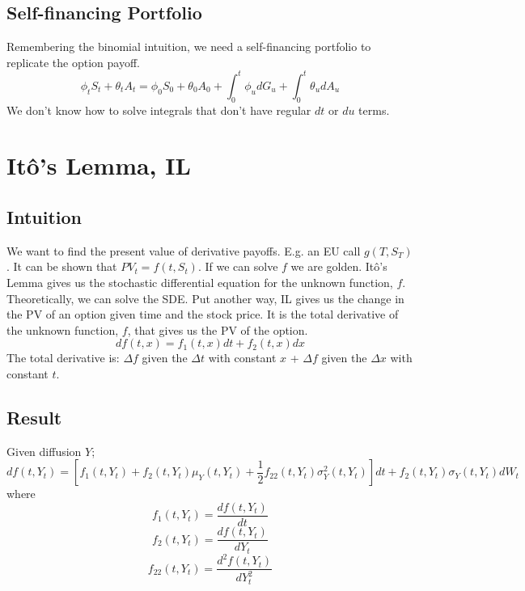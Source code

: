 \documentclass[12pt]{article}
\begin{document}
\subsection{Self-financing Portfolio}

Remembering the binomial intuition, we need a self-financing portfolio to
replicate the option payoff.
\begin{equation} \label{replport}
\phi_tS_t+\theta_tA_t=\phi_0S_0+\theta_0A_0+ \int_0^t \phi_u dG_u +
\int_0^t \theta_udA_u
\end{equation}
We don't know how to solve integrals that don't have regular $dt$ or $du$
terms.

\pagebreak

\section{It\^o's Lemma, IL}

\subsection{Intuition}

We want to find the present value of derivative payoffs. E.g. an EU call
$g(T, S_T)$. It can be shown that $PV_t=f(t, S_t)$. If we can solve $f$ we are
golden. It\^o's Lemma gives us the stochastic differential equation for the
unknown function, $f$. Theoretically, we can solve the SDE. Put another way,
IL gives us the change in the PV of an option given time and the stock price.
It is the total derivative of the unknown function, $f$, that gives us the PV
of the option.
$$df(t,x)=f_1(t,x)dt+f_2(t,x)dx$$
The total derivative is: $\Delta f$ given the $\Delta t$ with constant $x$ +
$\Delta f$ given the $\Delta x$ with constant $t$.

\subsection{Result}

Given diffusion $Y$;
\begin{equation} \label{IL}
df(t, Y_t) = \left[ f_1(t,Y_t)+f_2(t,Y_t) \mu_Y (t,Y_t)+ \frac{1}{2} f_{22}
(t,Y_t) \sigma_Y^2 (t,Y_t) \right] dt+f_2(t,Y_t)\sigma_Y (t,Y_t)dW_t
\end{equation}
where
$$f_1(t, Y_t)=\frac{df(t,Y_t)}{dt}$$
$$f_2(t, Y_t)=\frac{df(t,Y_t)}{dY_t}$$
$$f_{22}(t, Y_t)=\frac{d^2f(t,Y_t)}{dY_t^2}$$
\end{document}
